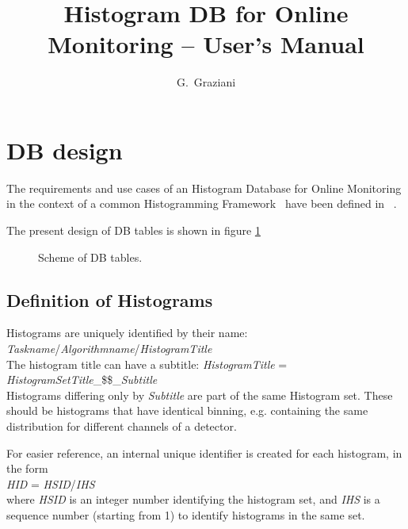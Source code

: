 \documentclass{lhcbnote}
\title{Histogram DB for Online Monitoring -- User's Manual}
\author{G.~Graziani}
\begin{document}
\maketitle




\section{DB design}
The requirements and use cases of an Histogram Database for Online
Monitoring in the context of a common Histogramming Framework~\cite{genhisto}
have been defined in ~\cite{dbdesign}.

The present design of DB tables is shown in figure \ref{DBschema}


\begin{figure}[htb]
\centerline{}
\caption{Scheme of DB tables. }
\label{DBschema}
\end{figure}

\subsection{Definition of Histograms}
Histograms are uniquely identified by their name:\\
{\it Taskname}/{\it Algorithmname}/{\it HistogramTitle}\\
The histogram title can have a subtitle:
{\it HistogramTitle} = {\it HistogramSetTitle}\_\$\$\_{\it Subtitle}\\
Histograms differing only by {\it Subtitle} are part of the same
Histogram set. These should be histograms that have identical binning,
e.g. containing the same distribution for different channels of a detector.

For easier reference, an internal unique identifier is created for
each histogram, in the form\\
{\it HID} = {\it HSID}/{\it IHS}\\
where {\it HSID} is an integer number identifying the histogram set,
and {\it IHS} is a sequence number (starting from 1) to identify histograms in
the same set.
\end{document}
